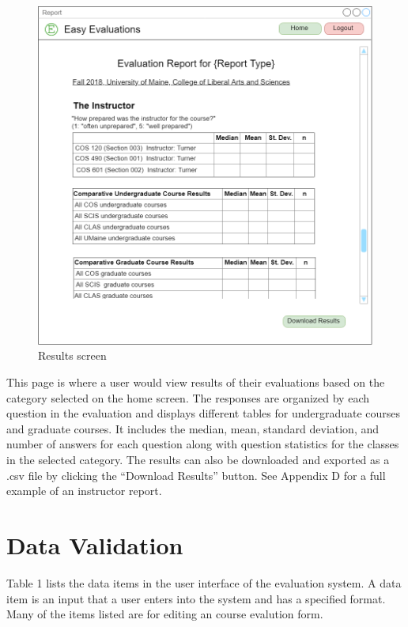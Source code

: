 \documentclass{article}
\begin{document}
\begin{center}
\begin{figure}[H]
    \centering
    \caption{Results screen}
    \includegraphics[width=6.5in]{images/report_screen.png}
\end{figure}
\end{center}

This page is where a user would view results of their evaluations based on the category selected on the home screen.  The responses are organized by each question in the evaluation and displays different tables for undergraduate courses and graduate courses. It includes the median, mean, standard deviation, and number of answers for each question along with question statistics for the classes in the selected category. The results can also be downloaded and exported as a .csv file by clicking the ``Download Results'' button. See Appendix D for a full example of an instructor report.

\newpage

\section{Data Validation}

Table 1 lists the data items in the user interface of the evaluation system. A data item is an input that a user enters into the system and has a specified format. Many of the items listed are for editing an course evalution form.
\end{document}
